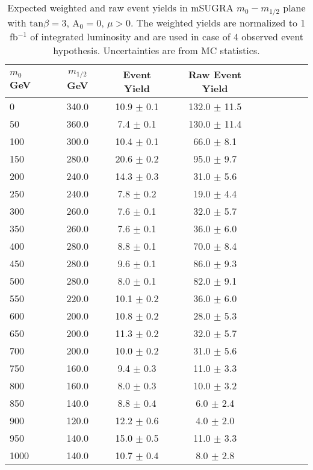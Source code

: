 \vspace{10 mm}
\begin{table}[hbt]
\begin{center}
\renewcommand{\arraystretch}{2.0}
 {\footnotesize
\begin{tabular}{|l|c|c|c|c|c|c|c|c|}\hline
$m_{0}$ GeV & $m_{1/2}$ GeV & Event Yield & Raw Event Yield \\ \hline
0 & 340.0 & 10.9 $\pm$ 0.1 & 132.0 $\pm$ 11.5 \\ 
50 & 360.0 & 7.4 $\pm$ 0.1 & 130.0 $\pm$ 11.4 \\ 
100 & 300.0 & 10.4 $\pm$ 0.1 & 66.0 $\pm$ 8.1 \\ 
150 & 280.0 & 20.6 $\pm$ 0.2 & 95.0 $\pm$ 9.7 \\ 
200 & 240.0 & 14.3 $\pm$ 0.3 & 31.0 $\pm$ 5.6 \\ 
250 & 240.0 & 7.8 $\pm$ 0.2 & 19.0 $\pm$ 4.4 \\ 
300 & 260.0 & 7.6 $\pm$ 0.1 & 32.0 $\pm$ 5.7 \\ 
350 & 260.0 & 7.6 $\pm$ 0.1 & 36.0 $\pm$ 6.0 \\ 
400 & 280.0 & 8.8 $\pm$ 0.1 & 70.0 $\pm$ 8.4 \\ 
450 & 280.0 & 9.6 $\pm$ 0.1 & 86.0 $\pm$ 9.3 \\ 
500 & 280.0 & 8.0 $\pm$ 0.1 & 82.0 $\pm$ 9.1 \\ 
550 & 220.0 & 10.1 $\pm$ 0.2 & 36.0 $\pm$ 6.0 \\ 
600 & 200.0 & 10.8 $\pm$ 0.2 & 28.0 $\pm$ 5.3 \\ 
650 & 200.0 & 11.3 $\pm$ 0.2 & 32.0 $\pm$ 5.7 \\ 
700 & 200.0 & 10.0 $\pm$ 0.2 & 31.0 $\pm$ 5.6 \\ 
750 & 160.0 & 9.4 $\pm$ 0.3 & 11.0 $\pm$ 3.3 \\ 
800 & 160.0 & 8.0 $\pm$ 0.3 & 10.0 $\pm$ 3.2 \\ 
850 & 140.0 & 8.8 $\pm$ 0.4 & 6.0 $\pm$ 2.4 \\ 
900 & 120.0 & 12.2 $\pm$ 0.6 & 4.0 $\pm$ 2.0 \\ 
950 & 140.0 & 15.0 $\pm$ 0.5 & 11.0 $\pm$ 3.3 \\ 
1000 & 140.0 & 10.7 $\pm$ 0.4 & 8.0 $\pm$ 2.8 \\ \hline
\end{tabular} }
\caption{Expected weighted and raw event yields in mSUGRA $m_{0}-m_{1/2}$ plane with tan$\beta = 3$, A$_0 = 0$, $\mu > 0$. The weighted yields are normalized to 1 fb$^{-1}$ of integrated luminosity and are used in case of 4 observed event hypothesis. Uncertainties are from MC statistics. \label{tab:ssyields_ex1fb}}
\end{center}
\end{table}
